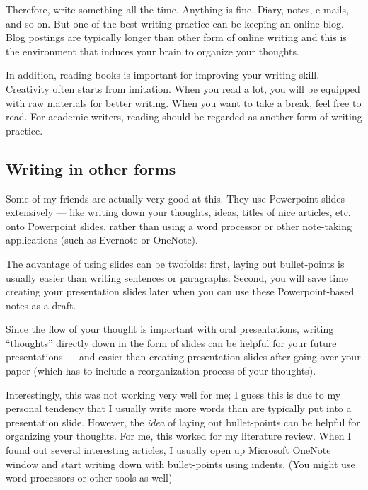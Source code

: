\documentclass[11pt]{article}
\begin{document}
Therefore, write something all the time. Anything is fine. Diary, notes,
e-mails, and so on. But one of the best writing practice can be keeping an
online blog. Blog postings are typically longer than other form of online
writing and this is the environment that induces your brain to organize your
thoughts. 

In addition, reading books is important for improving your writing skill.
Creativity often starts from imitation. When you read a lot, you will be
equipped with raw materials for better writing. When you want to take a
break, feel free to read. For academic writers, reading should be regarded as
another form of writing practice.

\subsection{Writing in other forms}

Some of my friends are actually very good at this. They use Powerpoint slides
extensively --- like writing down your thoughts, ideas, titles of nice
articles, etc. onto Powerpoint slides, rather than using a word processor or
other note-taking applications (such as Evernote or OneNote).

The advantage of using slides can be twofolds: first, laying out bullet-points
is usually easier than writing sentences or paragraphs. Second, you will save
time creating your presentation slides later when you can use these
Powerpoint-based notes as a draft.

Since the flow of your thought is important with oral presentations, writing
``thoughts'' directly down in the form of slides can be helpful for your
future presentations --- and easier than creating presentation slides
after going over your paper (which has to include a reorganization process of
your thoughts).

Interestingly, this was not working very well for me; I guess this is due to
my personal tendency that I usually write more words than are typically put
into a presentation slide. However, the \emph{idea} of laying out
bullet-points can be helpful for organizing your thoughts. For me, this worked
for my literature review. When I found out several interesting articles, I
usually open up Microsoft OneNote window and start writing down with
bullet-points using indents. (You might use word processors or other tools as
well)
\end{document}
